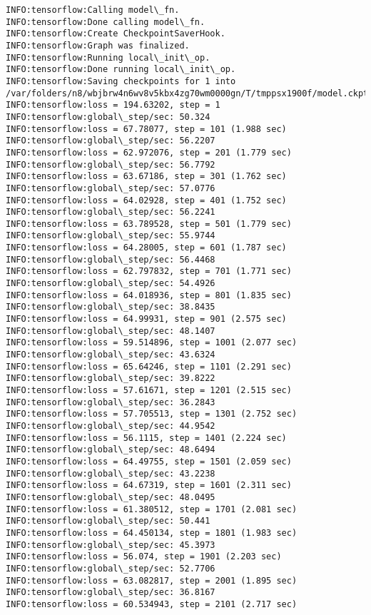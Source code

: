 \documentclass[11pt]{article}
\begin{document}
    \begin{Verbatim}[commandchars=\\\{\}]
INFO:tensorflow:Calling model\_fn.
INFO:tensorflow:Done calling model\_fn.
INFO:tensorflow:Create CheckpointSaverHook.
INFO:tensorflow:Graph was finalized.
INFO:tensorflow:Running local\_init\_op.
INFO:tensorflow:Done running local\_init\_op.
INFO:tensorflow:Saving checkpoints for 1 into /var/folders/n8/wbjbrw4n6wv8v5kbx4zg70wm0000gn/T/tmppsx1900f/model.ckpt.
INFO:tensorflow:loss = 194.63202, step = 1
INFO:tensorflow:global\_step/sec: 50.324
INFO:tensorflow:loss = 67.78077, step = 101 (1.988 sec)
INFO:tensorflow:global\_step/sec: 56.2207
INFO:tensorflow:loss = 62.972076, step = 201 (1.779 sec)
INFO:tensorflow:global\_step/sec: 56.7792
INFO:tensorflow:loss = 63.67186, step = 301 (1.762 sec)
INFO:tensorflow:global\_step/sec: 57.0776
INFO:tensorflow:loss = 64.02928, step = 401 (1.752 sec)
INFO:tensorflow:global\_step/sec: 56.2241
INFO:tensorflow:loss = 63.789528, step = 501 (1.779 sec)
INFO:tensorflow:global\_step/sec: 55.9744
INFO:tensorflow:loss = 64.28005, step = 601 (1.787 sec)
INFO:tensorflow:global\_step/sec: 56.4468
INFO:tensorflow:loss = 62.797832, step = 701 (1.771 sec)
INFO:tensorflow:global\_step/sec: 54.4926
INFO:tensorflow:loss = 64.018936, step = 801 (1.835 sec)
INFO:tensorflow:global\_step/sec: 38.8435
INFO:tensorflow:loss = 64.99931, step = 901 (2.575 sec)
INFO:tensorflow:global\_step/sec: 48.1407
INFO:tensorflow:loss = 59.514896, step = 1001 (2.077 sec)
INFO:tensorflow:global\_step/sec: 43.6324
INFO:tensorflow:loss = 65.64246, step = 1101 (2.291 sec)
INFO:tensorflow:global\_step/sec: 39.8222
INFO:tensorflow:loss = 57.61671, step = 1201 (2.515 sec)
INFO:tensorflow:global\_step/sec: 36.2843
INFO:tensorflow:loss = 57.705513, step = 1301 (2.752 sec)
INFO:tensorflow:global\_step/sec: 44.9542
INFO:tensorflow:loss = 56.1115, step = 1401 (2.224 sec)
INFO:tensorflow:global\_step/sec: 48.6494
INFO:tensorflow:loss = 64.49755, step = 1501 (2.059 sec)
INFO:tensorflow:global\_step/sec: 43.2238
INFO:tensorflow:loss = 64.67319, step = 1601 (2.311 sec)
INFO:tensorflow:global\_step/sec: 48.0495
INFO:tensorflow:loss = 61.380512, step = 1701 (2.081 sec)
INFO:tensorflow:global\_step/sec: 50.441
INFO:tensorflow:loss = 64.450134, step = 1801 (1.983 sec)
INFO:tensorflow:global\_step/sec: 45.3973
INFO:tensorflow:loss = 56.074, step = 1901 (2.203 sec)
INFO:tensorflow:global\_step/sec: 52.7706
INFO:tensorflow:loss = 63.082817, step = 2001 (1.895 sec)
INFO:tensorflow:global\_step/sec: 36.8167
INFO:tensorflow:loss = 60.534943, step = 2101 (2.717 sec)

\end{Verbatim}
\end{document}
